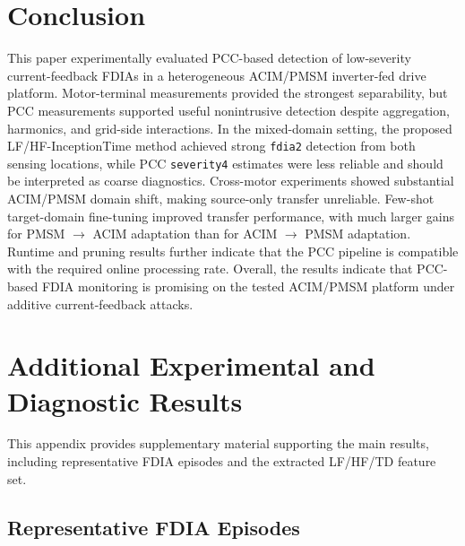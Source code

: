 \documentclass[lettersize,journal]{IEEEtran}
\begin{document}
\section{Conclusion}
\label{sec:conclusion}
This paper experimentally evaluated PCC-based detection of low-severity current-feedback FDIAs in a heterogeneous ACIM/PMSM inverter-fed drive platform. Motor-terminal measurements provided the strongest separability, but PCC measurements supported useful nonintrusive detection despite aggregation, harmonics, and grid-side interactions. In the mixed-domain setting, the proposed LF/HF-InceptionTime method achieved strong \texttt{fdia2} detection from both sensing locations, while PCC \texttt{severity4} estimates were less reliable and should be interpreted as coarse diagnostics. Cross-motor experiments showed substantial ACIM/PMSM domain shift, making source-only transfer unreliable. Few-shot target-domain fine-tuning improved transfer performance, with much larger gains for PMSM $\rightarrow$ ACIM adaptation than for ACIM $\rightarrow$ PMSM adaptation. Runtime and pruning results further indicate that the PCC pipeline is compatible with the required online processing rate. Overall, the results indicate that PCC-based FDIA monitoring is promising on the tested ACIM/PMSM platform under additive current-feedback attacks.




\appendices
\section{Additional Experimental and Diagnostic Results}
\label{app:additional_results}


This appendix provides supplementary material supporting the main results, including representative FDIA episodes and the extracted LF/HF/TD feature set.

\subsection{Representative FDIA Episodes}
\label{app:fdia_episode_examples}
\end{document}
